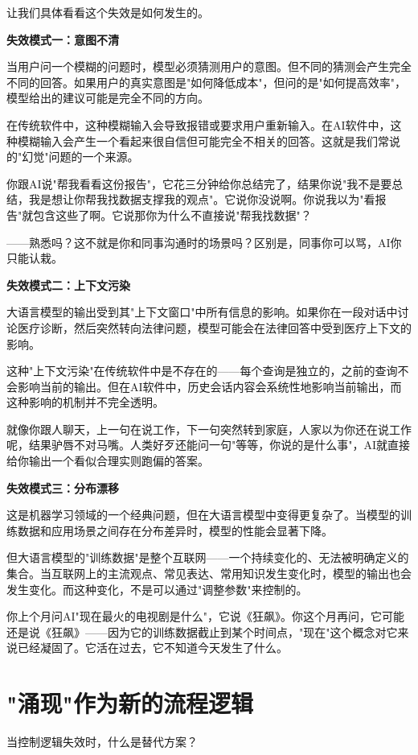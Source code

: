 让我们具体看看这个失效是如何发生的。

\textbf{失效模式一：意图不清}

当用户问一个模糊的问题时，模型必须猜测用户的意图。但不同的猜测会产生完全不同的回答。如果用户的真实意图是"如何降低成本"，但问的是"如何提高效率"，模型给出的建议可能是完全不同的方向。

在传统软件中，这种模糊输入会导致报错或要求用户重新输入。在AI软件中，这种模糊输入会产生一个看起来很自信但可能完全不相关的回答。这就是我们常说的"幻觉"问题的一个来源。

你跟AI说"帮我看看这份报告"，它花三分钟给你总结完了，结果你说"我不是要总结，我是想让你帮我找数据支撑我的观点"。它说你没说啊。你说我以为"看报告"就包含这些了啊。它说那你为什么不直接说"帮我找数据"？

——熟悉吗？这不就是你和同事沟通时的场景吗？区别是，同事你可以骂，AI你只能认栽。

\textbf{失效模式二：上下文污染}

大语言模型的输出受到其"上下文窗口"中所有信息的影响。如果你在一段对话中讨论医疗诊断，然后突然转向法律问题，模型可能会在法律回答中受到医疗上下文的影响。

这种"上下文污染"在传统软件中是不存在的——每个查询是独立的，之前的查询不会影响当前的输出。但在AI软件中，历史会话内容会系统性地影响当前输出，而这种影响的机制并不完全透明。

就像你跟人聊天，上一句在说工作，下一句突然转到家庭，人家以为你还在说工作呢，结果驴唇不对马嘴。人类好歹还能问一句"等等，你说的是什么事"，AI就直接给你输出一个看似合理实则跑偏的答案。

\textbf{失效模式三：分布漂移}

这是机器学习领域的一个经典问题，但在大语言模型中变得更复杂了。当模型的训练数据和应用场景之间存在分布差异时，模型的性能会显著下降。

但大语言模型的"训练数据"是整个互联网——一个持续变化的、无法被明确定义的集合。当互联网上的主流观点、常见表达、常用知识发生变化时，模型的输出也会发生变化。而这种变化，不是可以通过"调整参数"来控制的。

你上个月问AI"现在最火的电视剧是什么"，它说《狂飙》。你这个月再问，它可能还是说《狂飙》——因为它的训练数据截止到某个时间点，"现在"这个概念对它来说已经凝固了。它活在过去，它不知道今天发生了什么。

\section{"涌现"作为新的流程逻辑}


当控制逻辑失效时，什么是替代方案？

